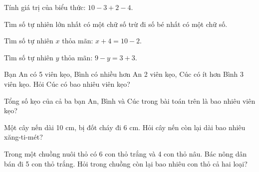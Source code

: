 \begin{ex}
Tính giá trị của biểu thức: $10 - 3 + 2 - 4$.
\end{ex}

\begin{ex}
Tìm số tự nhiên lớn nhất có một chữ số trừ đi số bé nhất có một chữ số.
\end{ex}

\begin{ex}
Tìm số tự nhiên $x$ thỏa mãn: $x + 4 = 10 - 2$.
\end{ex}

\begin{ex}
Tìm số tự nhiên $y$ thỏa mãn: $9 - y = 3 + 3$.
\end{ex}

\begin{ex}
Bạn An có 5 viên kẹo, Bình có nhiều hơn An 2 viên kẹo, Cúc có ít hơn Bình 3 viên kẹo. Hỏi Cúc có bao nhiêu viên kẹo?
\end{ex}

\begin{ex}
Tổng số kẹo của cả ba bạn An, Bình và Cúc trong bài toán trên là bao nhiêu viên kẹo?
\end{ex}

\begin{ex}
Một cây nến dài 10 cm, bị đốt cháy đi 6 cm. Hỏi cây nến còn lại dài bao nhiêu xăng-ti-mét?
\end{ex}

\begin{ex}
Trong một chuồng nuôi thỏ có 6 con thỏ trắng và 4 con thỏ nâu. Bác nông dân bán đi 5 con thỏ trắng. Hỏi trong chuồng còn lại bao nhiêu con thỏ cả hai loại?
\end{ex}

